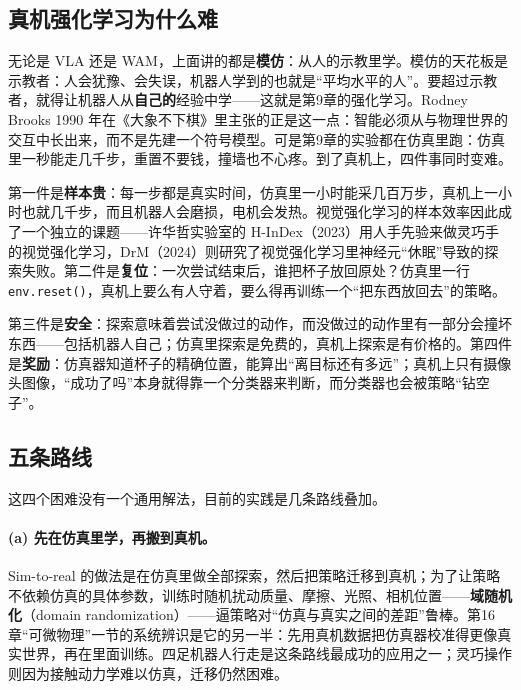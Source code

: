 \subsection{真机强化学习为什么难}

无论是 VLA 还是 WAM，上面讲的都是\textbf{模仿}：从人的示教里学。模仿的天花板是示教者：人会犹豫、会失误，机器人学到的也就是“平均水平的人”。要超过示教者，就得让机器人从\textbf{自己的}经验中学——这就是第9章的强化学习。Rodney Brooks 1990 年在《大象不下棋》里主张的正是这一点：智能必须从与物理世界的交互中长出来，而不是先建一个符号模型。可是第9章的实验都在仿真里跑：仿真里一秒能走几千步，重置不要钱，撞墙也不心疼。到了真机上，四件事同时变难。

第一件是\textbf{样本贵}：每一步都是真实时间，仿真里一小时能采几百万步，真机上一小时也就几千步，而且机器人会磨损，电机会发热。视觉强化学习的样本效率因此成了一个独立的课题——许华哲实验室的 H-InDex（2023）用人手先验来做灵巧手的视觉强化学习，DrM（2024）则研究了视觉强化学习里神经元“休眠”导致的探索失败。第二件是\textbf{复位}：一次尝试结束后，谁把杯子放回原处？仿真里一行 \texttt{env.reset()}，真机上要么有人守着，要么得再训练一个“把东西放回去”的策略。

第三件是\textbf{安全}：探索意味着尝试没做过的动作，而没做过的动作里有一部分会撞坏东西——包括机器人自己；仿真里探索是免费的，真机上探索是有价格的。第四件是\textbf{奖励}：仿真器知道杯子的精确位置，能算出“离目标还有多远”；真机上只有摄像头图像，“成功了吗”本身就得靠一个分类器来判断，而分类器也会被策略“钻空子”。

\subsection{五条路线}

这四个困难没有一个通用解法，目前的实践是几条路线叠加。

\paragraph{(a) 先在仿真里学，再搬到真机。}
Sim-to-real 的做法是在仿真里做全部探索，然后把策略迁移到真机；为了让策略不依赖仿真的具体参数，训练时随机扰动质量、摩擦、光照、相机位置——\textbf{域随机化}（domain randomization）——逼策略对“仿真与真实之间的差距”鲁棒。第16章“可微物理”一节的系统辨识是它的另一半：先用真机数据把仿真器校准得更像真实世界，再在里面训练。四足机器人行走是这条路线最成功的应用之一；灵巧操作则因为接触动力学难以仿真，迁移仍然困难。

